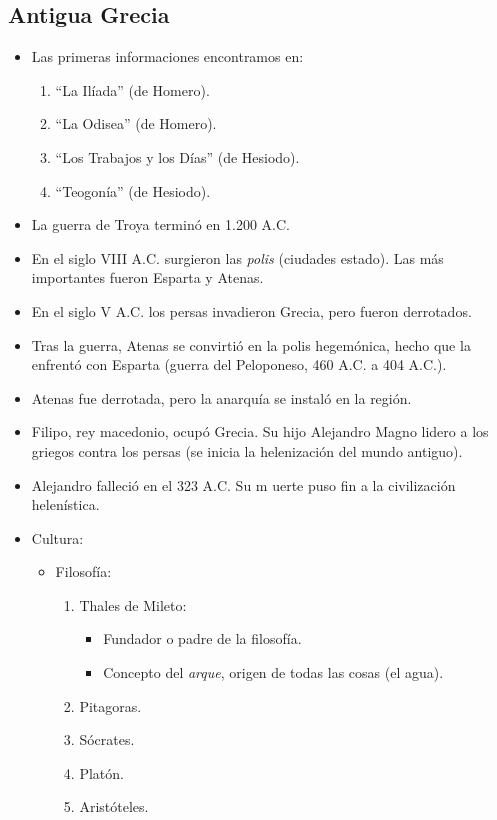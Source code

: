 \subsection{Antigua Grecia}

\begin{itemize}

\item Las primeras informaciones encontramos en:
\begin{enumerate}
	\item ``La Ilíada'' (de Homero).
	\item ``La Odisea'' (de Homero).
	\item ``Los Trabajos y los Días'' (de Hesiodo).
	\item ``Teogonía'' (de Hesiodo).
\end{enumerate}

\item La guerra de Troya terminó en 1.200 A.C.

\item En el siglo VIII A.C. surgieron las \emph{polis} (ciudades estado). Las más importantes fueron Esparta y Atenas.

\item En el siglo V A.C. los persas invadieron Grecia, pero fueron derrotados.

\item Tras la guerra, Atenas se convirtió en la polis hegemónica, hecho que la enfrentó con Esparta (guerra del Peloponeso, 460 A.C. a 404 A.C.).

\item Atenas fue derrotada, pero la anarquía se instaló en la región.

\item Filipo, rey macedonio, ocupó Grecia. Su hijo Alejandro Magno lidero a los griegos contra los persas (se inicia la helenización del mundo antiguo).

\item Alejandro falleció en el 323 A.C. Su m uerte puso fin a la civilización helenística.

\item Cultura:

\begin{itemize}

	\item Filosofía:
	\begin{enumerate}
		\item Thales de Mileto:
		\begin{itemize}
			\item Fundador o padre de la filosofía.
			\item Concepto del \emph{arque}, origen de todas las cosas (el agua).
		\end{itemize}
		\item Pitagoras.
		\item Sócrates.
		\item Platón.
		\item Aristóteles.
	\end{enumerate}
	

\end{itemize}
\end{itemize}
